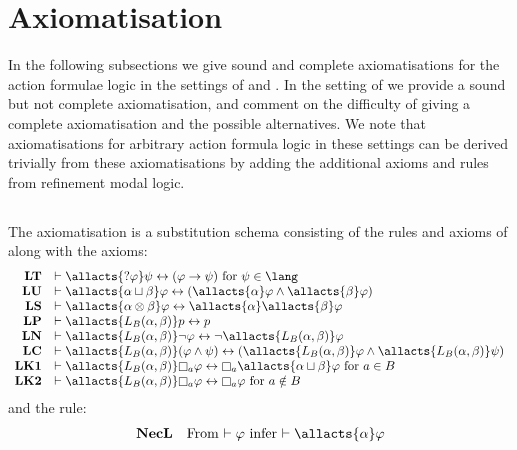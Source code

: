 \section{Axiomatisation}\label{aafl-axiomatisation}

In the following subsections we give sound and complete axiomatisations for the action formulae logic in the settings of \classK{} and \classKFF{}.
In the setting of \classS{} we provide a sound but not complete axiomatisation, and comment on the difficulty of giving a complete axiomatisation and the possible alternatives.
We note that axiomatisations for arbitrary action formula logic in these settings can be derived trivially from these axiomatisations by adding the additional axioms and rules from refinement modal logic.

\subsection{\classK{}}

\begin{definition}\label{afl-k-axioms}
The axiomatisation \axiomAflK{} is a substitution schema consisting of the rules and axioms of \axiomK{} along with the axioms:
$$
\begin{array}{rl}
    {\bf LT} & \proves \allacts{\test{\phi}} \psi \iff (\phi \implies \psi) \text{ for } \psi \in \lang\\
    {\bf LU} & \proves \allacts{\alpha \choice \beta} \phi \iff (\allacts{\alpha} \phi \land \allacts{\beta} \phi)\\
    {\bf LS} & \proves \allacts{\alpha \compose \beta} \phi \iff \allacts{\alpha} \allacts{\beta} \phi\\
    {\bf LP} & \proves \allacts{\learns_\agentsB (\alpha, \beta)} \atomP \iff \atomP\\
    {\bf LN} & \proves \allacts{\learns_\agentsB (\alpha, \beta)} \neg \phi \iff \neg \allacts{\learns_\agentsB (\alpha, \beta)} \phi\\
    {\bf LC} & \proves \allacts{\learns_\agentsB (\alpha, \beta)} (\phi \land \psi) \iff (\allacts{\learns_\agentsB (\alpha, \beta)} \phi \land \allacts{\learns_\agentsB (\alpha, \beta)} \psi)\\
    {\bf LK1} & \proves \allacts{\learns_\agentsB (\alpha, \beta)} \necessary[\agentA] \phi \iff \necessary[\agentA] \allacts{\alpha \choice \beta} \phi \text{ for } \agentA \in \agentsB\\
    {\bf LK2} & \proves \allacts{\learns_\agentsB (\alpha, \beta)} \necessary[\agentA] \phi \iff \necessary[\agentA] \phi \text{ for } \agentA \notin \agentsB
\end{array}
$$
and the rule:
$$
\begin{array}{rl}
    {\bf NecL} & \text{From $\proves \phi$ infer $\proves \allacts{\alpha} \phi$}
\end{array}
$$
\end{definition}

